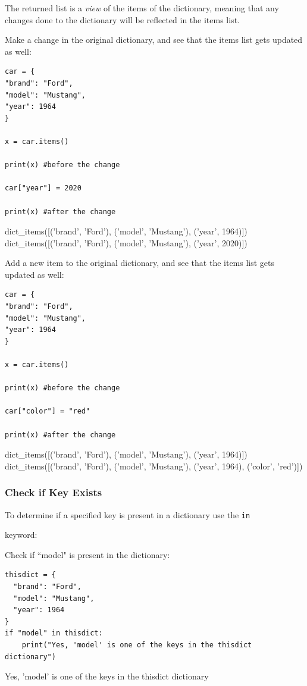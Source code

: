 \documentclass[12pt,a4paper]{article}
\newcommand{\code}[1]{%
	\colorbox{backcolour}{\lstinline{#1}}%
}
\begin{document}
The returned list is a \textit{view} of the items of the dictionary, meaning
that any changes done to the dictionary will be reflected in the items list.

\begin{ebox}
Make a change in the original dictionary, and see that the items list gets updated as well:
	\begin{lstlisting}
car = {
"brand": "Ford",
"model": "Mustang",
"year": 1964
}

x = car.items()

print(x) #before the change

car["year"] = 2020

print(x) #after the change
	\end{lstlisting}
\tcblower
	\begin{vercode}
dict_items([('brand', 'Ford'), ('model', 'Mustang'), ('year', 1964)])
dict_items([('brand', 'Ford'), ('model', 'Mustang'), ('year', 2020)])
	\end{vercode}
\end{ebox}

\begin{ebox}
Add a new item to the original dictionary, and see that the items list gets
updated as well:
	\begin{lstlisting}
car = {
"brand": "Ford",
"model": "Mustang",
"year": 1964
}

x = car.items()

print(x) #before the change

car["color"] = "red"

print(x) #after the change
	\end{lstlisting}
\tcblower
	\begin{vercode}
dict_items([('brand', 'Ford'), ('model', 'Mustang'), ('year', 1964)])
dict_items([('brand', 'Ford'), ('model', 'Mustang'), ('year', 1964),
	('color', 'red')])
	\end{vercode}
\end{ebox}
\subsubsection{Check if Key Exists}

To determine if a specified key is present in a dictionary use the \code{in}
keyword:

\begin{ebox}
Check if ``model" is present in the dictionary:
	\begin{lstlisting}
thisdict = {
  "brand": "Ford",
  "model": "Mustang",
  "year": 1964
}
if "model" in thisdict:
    print("Yes, 'model' is one of the keys in the thisdict dictionary")
	\end{lstlisting}
\tcblower
	\begin{vercode}
Yes, 'model' is one of the keys in the thisdict dictionary
	\end{vercode}
\end{ebox}
\end{document}
